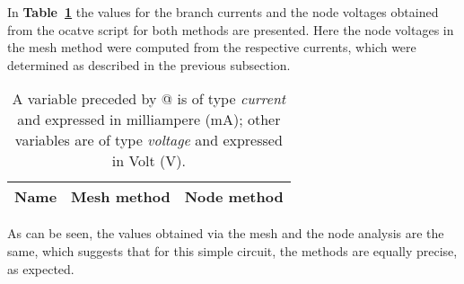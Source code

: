 In \textbf{Table~\ref{tab:theoretical}} the values for the branch currents and the node voltages obtained from the ocatve script for both methods are presented. Here the node voltages in the mesh method were computed from the respective currents, which were determined as described in the previous subsection.
\begin{table}[h]
  \centering
  \begin{tabular}{|l|r|r|}
    \hline    
    {\bf Name} & {\bf Mesh method} & {\bf Node method}\\ \hline
    
  \end{tabular}
  \caption{A variable preceded by @ is of type {\em current}
    and expressed in milliampere (mA); other variables are of type {\it voltage} and expressed in
    Volt (V).}
  \label{tab:theoretical}
\end{table}

As can be seen, the values obtained via the mesh and the node analysis are the same, which suggests that for this simple circuit, the methods are equally precise, as expected.
